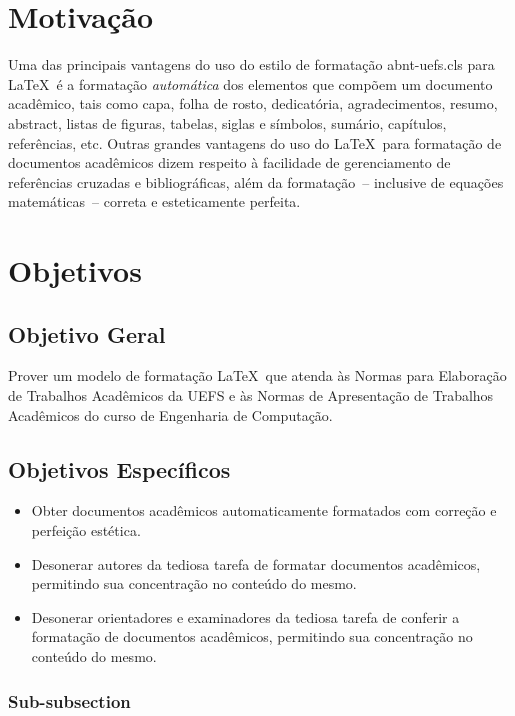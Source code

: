 \section{Motiva\c{c}\~ao}

Uma das principais vantagens do uso do estilo de formata\c{c}\~ao {\ttfamily abnt-uefs.cls} para \LaTeX\ \'e a formata\c{c}\~ao \textit{autom\'atica} dos elementos que comp\~oem um documento acad\^emico, tais como capa, folha de rosto, dedicat\'oria, agradecimentos, resumo, abstract, listas de figuras, tabelas, siglas e s\'imbolos, sum\'ario, cap\'itulos, refer\^encias, etc. Outras grandes vantagens do uso do \LaTeX\ para formata\c{c}\~ao de documentos acad\^emicos dizem respeito \`a facilidade de gerenciamento de refer\^encias cruzadas e bibliogr\'aficas, al\'em da formata\c{c}\~ao~-- inclusive de equa\c{c}\~oes  matem\'aticas~-- correta e esteticamente perfeita.

\section{Objetivos}

\subsection{Objetivo Geral}

Prover um modelo de formata\c{c}\~ao \LaTeX\ que atenda \`as Normas para Elabora\c{c}\~ao de Trabalhos Acad\^emicos da UEFS e \`as Normas de Apresenta\c{c}\~ao de Trabalhos Acad\^emicos do curso de Engenharia de Computa\c{c}\~ao.

\subsection{Objetivos Espec\'ificos}

\begin{itemize}
	\item Obter documentos acad\^emicos automaticamente formatados com corre\c{c}\~ao e perfei\c{c}\~ao est\'etica.
	\item Desonerar autores da tediosa tarefa de formatar documentos acad\^emicos, permitindo sua concentra\c{c}\~ao no conte\'udo do mesmo.
	\item Desonerar orientadores e examinadores da tediosa tarefa de conferir a formata\c{c}\~ao de documentos acad\^emicos, permitindo sua concentra\c{c}\~ao no conte\'udo do mesmo.
\end{itemize}

\subsubsection{Sub-subsection}
